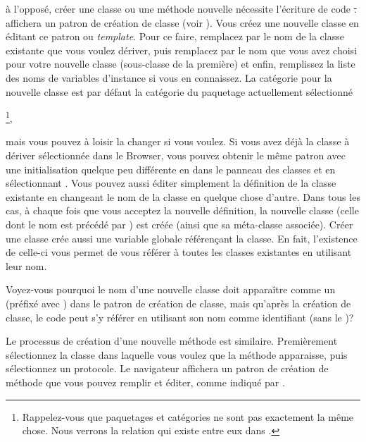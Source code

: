 \documentclass[a4paper,10pt,twoside]{book}
\begin{document}
à l'opposé, créer une classe ou une méthode nouvelle nécessite 
l'écriture de code \st.
affichera un patron de création de classe
(voir ).
Vous créez une nouvelle classe en éditant ce patron ou \emph{template}. 
Pour ce faire, remplacez  par le nom de la classe existante
que vous voulez dériver, puis remplacez  par le nom
que vous avez choisi pour votre nouvelle classe (sous-classe de la première) 
et enfin, remplissez la liste des noms de variables d'instance si vous en connaissez.  
La catégorie pour la nouvelle classe est par défaut la
catégorie du paquetage actuellement sélectionné

\footnote{Rappelez-vous que paquetages et catégories ne sont pas exactement la même chose. 
Nous verrons la relation qui existe entre eux dans .}, 

mais vous pouvez à loisir la changer si vous voulez.
Si vous avez déjà la classe à dériver sélectionnée dans 
le Browser, vous pouvez obtenir le même patron avec une initialisation
quelque peu différente en \actclickant dans le panneau des classes et en sélectionnant 
.
Vous pouvez aussi éditer simplement la définition de la classe existante en changeant 
le nom de la classe en quelque chose d'autre.
Dans tous les cas, à chaque fois que vous acceptez la nouvelle définition, la nouvelle classe 
(celle dont le nom est précédé par \ct{#}) est créée (ainsi que sa méta-classe associée).  
Créer une classe crée aussi une variable globale référençant
la classe. En fait, l'existence de celle-ci vous permet de vous 
référer à toutes les classes existantes en utilisant leur nom.

Voyez-vous pourquoi le nom d'une nouvelle classe doit apparaître
comme un  (\ie préfixé avec \ct{#}) dans le
patron de création de classe, mais qu'après la création
de classe, le code peut s'y référer en utilisant
son nom comme identifiant (\ie sans le \ct{#})?

Le processus de création d'une nouvelle méthode
est similaire. Premièrement sélectionnez la classe dans laquelle vous
voulez que la méthode apparaisse, puis sélectionnez un protocole.
Le navigateur affichera un patron de création de méthode que
vous pouvez remplir et éditer, comme indiqué par
.
\end{document}
